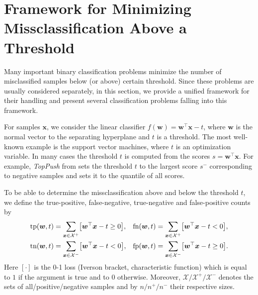 \documentclass{Thesis}
\newcommand{\Brac}[2][r]{%
  \ifx r#1 \left(       #2 \right)       \else
  \ifx c#1 \left\{      #2 \right\}      \else
  \ifx s#1 \left[       #2 \right]       \else
  \ifx v#1 \left\vert   #2 \right\vert   \else
  \ifx a#1 \left\langle #2 \right\rangle \else
  \ifx t#1 \left\lceil  #2 \right\rceil  \else
  \ifx b#1 \left\lfloor #2 \right\rfloor \else
  \ifx n#1 \left\|      #2 \right\|      \else
  \mathrm{Illegal~option}%
  \fi\fi\fi\fi\fi\fi\fi\fi
}
\newcommand{\Xc}{\mathcal{X}}
\newcommand{\TopPush}{\emph{TopPush}\xspace}
\newcommand{\tp}{\textnormal{tp}}
\newcommand{\tn}{\textnormal{tn}}
\newcommand{\fp}{\textnormal{fp}}
\newcommand{\fn}{\textnormal{fn}}
\begin{document}
\section{Framework for Minimizing Missclassification Above a Threshold}\label{sec:framework}

Many important binary classification problems minimize the number of misclassified samples below (or above) certain threshold. Since these problems are usually considered separately, in this section, we provide a unified framework for their handling and present several classification problems falling into this framework.

For samples $\bm{x}$, we consider the linear classifier $f(\bm{w}) = \bm{w}^\top \bm{x} - t$, where $\bm{w}$ is the normal vector to the separating hyperplane and $t$ is a threshold. The most well-known example is the support vector machines, where $t$ is an optimization variable. In many cases the threshold $t$ is computed from the scores $s = \bm{w}^\top \bm{x}$. For example, \TopPush from \cite{Li_TopPush} sets the threshold $t$ to the largest score $s^-$ corresponding to negative samples and \cite{Grill_2016} sets it to the quantile of all scores.

To be able to determine the missclassification above and below the threshold $t$, we define the true-positive, false-negative, true-negative and false-positive counts by
\begin{equation}\label{eq:defin_counts}
  \begin{aligned}
    \tp(\bm{w}, t) & = \sum_{\bm{x} \in \Xc^+}\Brac[s]{\bm{w}^\top \bm{x} - t \ge 0}, &
    \fn(\bm{w}, t) & = \sum_{\bm{x} \in \Xc^+}\Brac[s]{\bm{w}^\top \bm{x} - t < 0}, \\
    \tn(\bm{w}, t) & = \sum_{\bm{x} \in \Xc^-}\Brac[s]{\bm{w}^\top \bm{x} - t < 0}, &
    \fp(\bm{w}, t) & = \sum_{\bm{x} \in \Xc^-}\Brac[s]{\bm{w}^\top \bm{x} - t \ge 0}.
  \end{aligned}
\end{equation}
Here $[\cdot]$ is the 0-1 loss (Iverson bracket, characteristic function) which is equal to $1$ if the argument is true and to $0$ otherwise. Moreover, $\Xc / \Xc^{+} / \Xc^{-}$ denotes the sets of all/positive/negative samples and by $n / n^{+} / n^{-}$ their respective sizes. 
\end{document}
